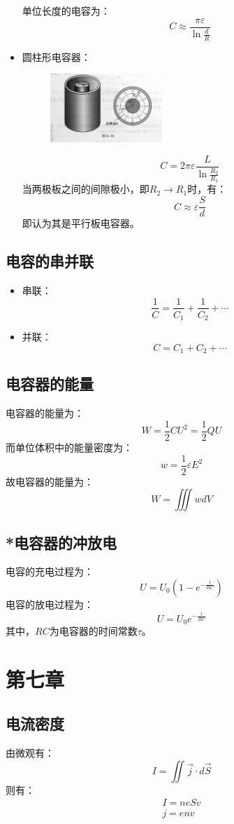 \documentclass{ctexart}
\begin{document}
\begin{itemize}
\begin{figure}[H]
    \end{figure}
    单位长度的电容为：
    $$
        C \approx \frac{\pi \varepsilon}{\ln \frac{d}{R}}
    $$
    \item 圆柱形电容器：
    \begin{figure}[H]
        \centering
        \includegraphics[width=0.4\textwidth]{img/6-16.jpg}
    \end{figure}
    $$
        C = 2\pi \varepsilon \frac{L}{\ln \frac{R_2}{R_1}}
    $$
    当两极板之间的间隙极小，即$R_2 \to R_1$时，有：
    $$
        C \approx \varepsilon \frac{S}{d}
    $$
    即认为其是平行板电容器。
\end{itemize}
\subsection{电容的串并联}
\begin{itemize}
    \item 串联：
    $$
        \frac{1}{C} = \frac{1}{C_1} + \frac{1}{C_2} + \cdots
    $$
    \item 并联：
    $$
        C = C_1 + C_2 + \cdots
    $$
\end{itemize}
\subsection{电容器的能量}
电容器的能量为：
$$
    W = \frac{1}{2} CU^2 = \frac{1}{2} QU
$$
而单位体积中的能量密度为：
$$
    w = \frac{1}{2} \varepsilon E^2
$$
故电容器的能量为：
$$
    W = \iiint w dV
$$
\subsection{*电容器的冲放电}
电容的充电过程为：
$$
    U = U_0 (1 - e^{-\frac{t}{RC}})
$$
电容的放电过程为：
$$
    U = U_0 e^{-\frac{t}{RC}}
$$
其中，$RC$为电容器的时间常数$\tau$。
\section{第七章}
\subsection{电流密度}
由微观有：
$$
    I = \iint \vec{j} \cdot d\vec{S}
$$
则有：
\begin{align*}
    I = neSv \\
    j = env
\end{align*}
\end{document}

